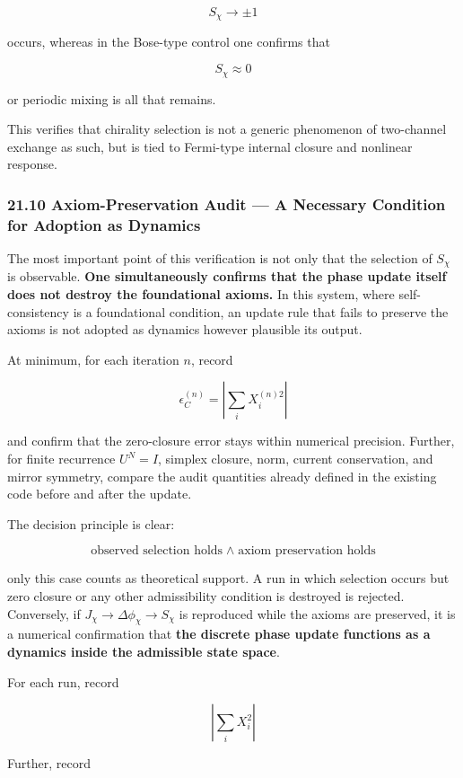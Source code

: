 \documentclass[
  a4paper,
]{article}
\begin{document}
\[
S_\chi\to\pm1
\]

occurs, whereas in the Bose-type control one confirms that

\[
S_\chi\approx0
\]

or periodic mixing is all that remains.

This verifies that chirality selection is not a generic phenomenon of
two-channel exchange as such, but is tied to Fermi-type internal closure
and nonlinear response.

\subsubsection{21.10 Axiom-Preservation Audit --- A Necessary Condition
for Adoption as
Dynamics}\label{axiom-preservation-audit-a-necessary-condition-for-adoption-as-dynamics}

The most important point of this verification is not only that the
selection of \(S_\chi\) is observable. \textbf{One simultaneously
confirms that the phase update itself does not destroy the foundational
axioms.} In this system, where self-consistency is a foundational
condition, an update rule that fails to preserve the axioms is not
adopted as dynamics however plausible its output.

At minimum, for each iteration \(n\), record

\[
\epsilon_C^{(n)}
=
\left|\sum_i X_i^{(n)2}\right|
\]

and confirm that the zero-closure error stays within numerical
precision. Further, for finite recurrence \(U^N=I\), simplex closure,
norm, current conservation, and mirror symmetry, compare the audit
quantities already defined in the existing code before and after the
update.

The decision principle is clear:

\[
\boxed{
\text{observed selection holds}
\;\land\;
\text{axiom preservation holds}
}
\]

only this case counts as theoretical support. A run in which selection
occurs but zero closure or any other admissibility condition is
destroyed is rejected. Conversely, if
\(J_\chi\to\Delta\phi_\chi\to S_\chi\) is reproduced while the axioms
are preserved, it is a numerical confirmation that \textbf{the discrete
phase update functions as a dynamics inside the admissible state space}.

For each run, record

\[
\left|
\sum_iX_i^2
\right|
\]

Further, record
\end{document}
